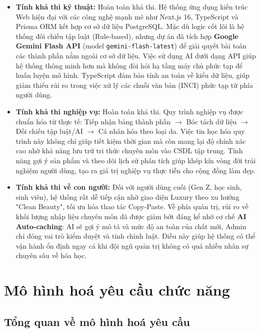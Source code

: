 \documentclass[12pt,a4paper]{article}
\begin{document}
\begin{itemize}
    \item \textbf{Tính khả thi kỹ thuật:} Hoàn toàn khả thi. Hệ thống ứng dụng kiến trúc Web hiện đại với các công nghệ mạnh mẽ như Next.js 16, TypeScript và Prisma ORM kết hợp cơ sở dữ liệu PostgreSQL. Mặc dù logic cốt lõi là hệ thống đối chiếu tập luật (Rule-based), nhưng dự án đã tích hợp \textbf{Google Gemini Flash API} (model \texttt{gemini-flash-latest}) để giải quyết bài toán các thành phần nằm ngoài cơ sở dữ liệu. Việc sử dụng AI dưới dạng API giúp hệ thống thông minh hơn mà không đòi hỏi hạ tầng máy chủ phức tạp để huấn luyện mô hình. TypeScript đảm bảo tính an toàn về kiểu dữ liệu, giúp giảm thiểu rủi ro trong việc xử lý các chuỗi văn bản (INCI) phức tạp từ phía người dùng.

    \item \textbf{Tính khả thi nghiệp vụ:} Hoàn toàn khả thi. Quy trình nghiệp vụ được chuẩn hóa từ thực tế: Tiếp nhận bảng thành phần $\rightarrow$ Bóc tách dữ liệu $\rightarrow$ Đối chiếu tập luật/AI $\rightarrow$ Cá nhân hóa theo loại da. Việc tin học hóa quy trình này không chỉ giúp tiết kiệm thời gian mà còn mang lại độ chính xác cao nhờ khả năng lưu trữ tri thức chuyên môn vào CSDL tập trung. Tính năng gợi ý sản phẩm và theo dõi lịch sử phân tích giúp khép kín vòng đời trải nghiệm người dùng, tạo ra giá trị nghiệp vụ thực tiễn cho cộng đồng làm đẹp.

    \item \textbf{Tính khả thi về con người:} Đối với người dùng cuối (Gen Z, học sinh, sinh viên), hệ thống rất dễ tiếp cận nhờ giao diện Luxury theo xu hướng "Clean Beauty", tối ưu hóa thao tác Copy-Paste. Về phía quản trị, rủi ro về khối lượng nhập liệu chuyên môn đã được giảm bớt đáng kể nhờ cơ chế \textbf{AI Auto-caching}: AI sẽ gợi ý mô tả và mức độ an toàn của chất mới, Admin chỉ đóng vai trò kiểm duyệt và tinh chỉnh luật. Điều này giúp hệ thống có thể vận hành ổn định ngay cả khi đội ngũ quản trị không có quá nhiều nhân sự chuyên sâu về hóa học.
\end{itemize}

\section{Mô hình hoá yêu cầu chức năng}
\subsection{Tổng quan về mô hình hoá yêu cầu}
\end{document}
